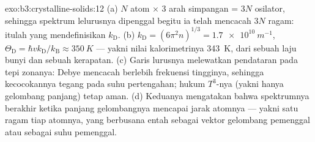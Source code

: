\begin{solution}{exo:b3:crystalline-solids:12}
(a) $N$ atom $\times$ 3 arah simpangan = $3N$
osilator, sehingga spektrum lelurusnya dipenggal begitu ia telah
mencacah $3N$ ragam: itulah yang mendefinisikan $k_{\text{D}}$. (b)
$k_{\text{D}} = (6\pi^2n)^{1/3} = \qty{1.7e10}{m^{-1}}$,
$\Theta_{\text{D}} = \hbar vk_{\text{D}}/k_{\text{B}} \approx
\qty{350}{K}$ --- yakni nilai kalorimetrinya \qty{343}{K}, dari sebuah laju
bunyi dan sebuah kerapatan. (c) Garis lurusnya melewatkan pendataran
pada tepi zonanya: Debye mencacah berlebih frekuensi tingginya, sehingga
kecocokannya tegang pada suhu pertengahan; hukum $T^3$-nya (yakni hanya
gelombang panjang) tetap aman. (d) Keduanya mengatakan bahwa spektrumnya berakhir ketika panjang
gelombangnya mencapai jarak atomnya --- yakni satu ragam tiap atomnya, yang
berbusana entah sebagai vektor gelombang pemenggal atau sebagai suhu pemenggal.
\end{solution}

